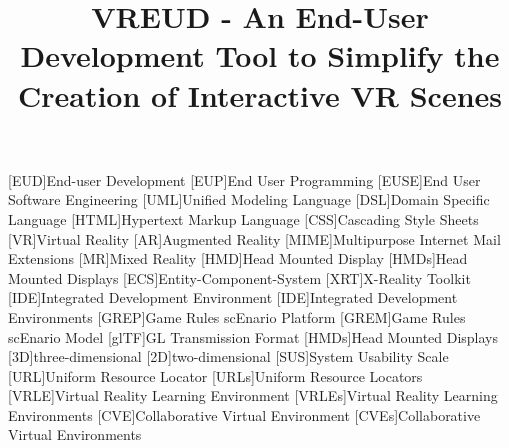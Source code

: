 \documentclass[conference]{IEEEtran}
\begin{document}
[EUD]{End-user Development}
[EUP]{End User Programming}
[EUSE]{End User Software Engineering}
[UML]{Unified Modeling Language}
[DSL]{Domain Specific Language}
[HTML]{Hypertext Markup Language}
[CSS]{Cascading Style Sheets}
[VR]{Virtual Reality}
[AR]{Augmented Reality}
[MIME]{Multipurpose Internet Mail Extensions}
[MR]{Mixed Reality}
[HMD]{Head Mounted Display}
[HMDs]{Head Mounted Displays}
[ECS]{Entity-Component-System}
[XRT]{X-Reality Toolkit}
[IDE]{Integrated Development Environment}
[IDE]{Integrated Development Environments}
[GREP]{Game Rules scEnario Platform}
[GREM]{Game Rules scEnario Model}
[glTF]{GL Transmission Format}
[HMDs]{Head Mounted Displays}
[3D]{three-dimensional}
[2D]{two-dimensional}
[SUS]{System Usability Scale}
[URL]{Uniform Resource Locator}
[URLs]{Uniform Resource Locators}
[VRLE]{Virtual Reality Learning Environment}
[VRLEs]{Virtual Reality Learning Environments}
[CVE]{Collaborative Virtual Environment}
[CVEs]{Collaborative Virtual Environments}

\title{VREUD - An End-User Development Tool to Simplify the Creation of Interactive VR Scenes
}

\author{
}


\maketitle

\end{document}
